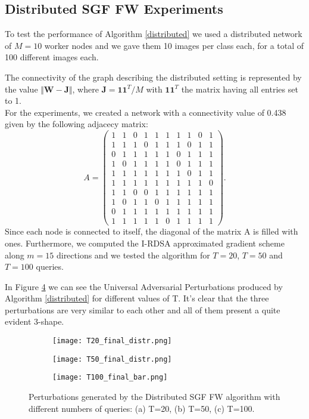 \subsection{Distributed SGF FW Experiments}
To test the performance of Algorithm \ref{distributed} we used a distributed network of $M=10$ worker nodes and we
gave them 10 images per class each, for a total of 100 different images each.

The connectivity of the graph describing the distributed setting is represented by the value $\Vert \mathbf{W}- \mathbf{J} \Vert$,
where $\mathbf{J}= \mathbf{11}^T/M$ with $\mathbf{11}^T$ the matrix having all entries set to 1.\\ For the experiments, we created a network
with a connectivity value of 0.438 given by the following adjacecy
matrix:
\[ A =
\begin{pmatrix}
1& 1& 0& 1& 1& 1& 1& 1& 0& 1\\
1& 1& 1& 0& 1& 1& 1& 0& 1& 1\\
0& 1& 1& 1& 1& 1& 0& 1& 1& 1\\
1& 0& 1& 1& 1& 1& 0& 1& 1& 1\\
1& 1& 1& 1& 1& 1& 1& 0& 1& 1\\
1& 1& 1& 1& 1& 1& 1& 1& 1& 0\\
1& 1& 0& 0& 1& 1& 1& 1& 1& 1\\
1& 0& 1& 1& 0& 1& 1& 1& 1& 1\\
0& 1& 1& 1& 1& 1& 1& 1& 1& 1\\
1& 1& 1& 1& 1& 0& 1& 1& 1& 1
\end{pmatrix}
.\]
\indent Since each node is connected to itself, the diagonal of the matrix A is filled with ones.
Furthermore, we computed the I-RDSA approximated gradient scheme along $m=15$ directions and we tested the algorithm for $T=20$, $T=50$ and $T=100$ queries.

In Figure \ref{fig:perturbations} we can see the Universal Adversarial Perturbations produced by Algorithm \ref{distributed}
for different values of T. It's clear that the three perturbations are very similar to each other and all of them present a quite evident 3-shape.
\begin{figure}[h]
	\centering
	\begin{subfigure}[b]{0.15\textwidth}
		\centering
		\texttt{[image: T20\_final\_distr.png]}
		\caption{}
		\label{fig:distributed_perturbation_20}
	\end{subfigure}
	\hfill
	\begin{subfigure}[b]{0.15\textwidth}
		\texttt{[image: T50\_final\_distr.png]}
		\caption{}
		\label{fig:variance-distributed_perturbation_50}
	\end{subfigure}
	\hfill
	\begin{subfigure}[b]{0.15\textwidth}
		\texttt{[image: T100\_final\_bar.png]}
		\caption{}
		\label{fig:distributed_perturbation_100}
	\end{subfigure}
	\caption{{\small Perturbations generated by the Distributed SGF FW algorithm with different numbers of queries: (a) T=20, (b) T=50, (c) T=100.}}
	\label{fig:perturbations}
\end{figure}


